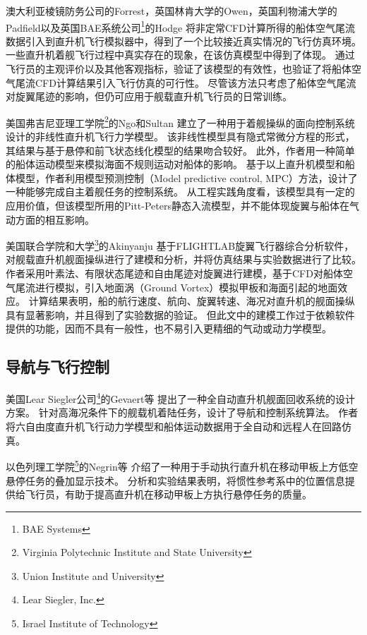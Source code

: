 \documentclass[doctor,openright,twoside,color]{buaathesis}
\begin{document}
澳大利亚棱镜防务公司的Forrest，英国林肯大学的Owen，英国利物浦大学的Padfield以及英国BAE系统公司\footnote{BAE Systems}的Hodge
将非定常CFD计算所得的船体空气尾流数据引入到直升机飞行模拟器中，得到了一个比较接近真实情况的飞行仿真环境。
一些直升机着舰飞行过程中真实存在的现象，在该仿真模型中得到了体现。
通过飞行员的主观评价以及其他客观指标，验证了该模型的有效性，也验证了将船体空气尾流CFD计算结果引入飞行仿真的可行性。
尽管该方法只考虑了船体空气尾流对旋翼尾迹的影响，但仍可应用于舰载直升机飞行员的日常训练。

美国弗吉尼亚理工学院\footnote{Virginia Polytechnic Institute and State University}的Ngo和Sultan
建立了一种用于着舰操纵的面向控制系统设计的非线性直升机飞行力学模型。
该非线性模型具有隐式常微分方程的形式，其结果与基于悬停和前飞状态线化模型的结果吻合较好。
此外，作者用一种简单的船体运动模型来模拟海面不规则运动对船体的影响。
基于以上直升机模型和船体模型，作者利用模型预测控制（Model predictive control, MPC）方法，设计了一种能够完成自主着舰任务的控制系统。
从工程实践角度看，该模型具有一定的应用价值，但该模型所用的Pitt-Peters静态入流模型，并不能体现旋翼与船体在气动方面的相互影响。

美国联合学院和大学\footnote{Union Institute and University}的Akinyanju
基于FLIGHTLAB旋翼飞行器综合分析软件，对舰载直升机舰面操纵进行了建模和分析，并将仿真结果与实验数据进行了比较。
作者采用叶素法、有限状态尾迹和自由尾迹对旋翼进行建模，基于CFD对船体空气尾流进行模拟，引入地面涡（Ground Vortex）模拟甲板和海面引起的地面效应。
计算结果表明，船的航行速度、航向、旋翼转速、海况对直升机的舰面操纵具有显著影响，并且得到了实验数据的验证。
但此文中的建模工作过于依赖软件提供的功能，因而不具有一般性，也不易引入更精细的气动或动力学模型。

\subsection{导航与飞行控制}

美国Lear Siegler公司\footnote{Lear Siegler, Inc.}的Gevaert等
提出了一种全自动直升机舰面回收系统的设计方案。
针对高海况条件下的舰载机着陆任务，设计了导航和控制系统算法。
作者将六自由度直升机飞行动力学模型和船体运动数据用于全自动和远程人在回路仿真。

以色列理工学院\footnote{Israel Institute of Technology}的Negrin等
介绍了一种用于手动执行直升机在移动甲板上方低空悬停任务的叠加显示技术。
分析和实验结果表明，将惯性参考系中的位置信息提供给飞行员，有助于提高直升机在移动甲板上方执行悬停任务的质量。
\end{document}
